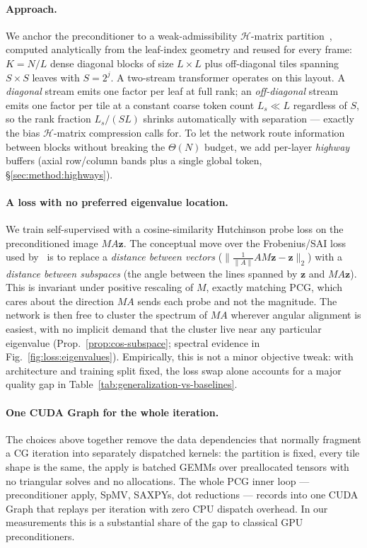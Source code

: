 \documentclass[acmtog,anonymous,review]{acmart}
\theoremstyle{plain}
\begin{document}
\paragraph{Approach.}\label{intro:hierarchical}\hypertarget{intro:hierarchical}{}%
We anchor the preconditioner to a weak-admissibility $\mathcal{H}$-matrix
partition~\cite{hackbusch2002adaptive}, computed analytically from the leaf-index
geometry and reused for every frame: $K\!=\!N/L$ dense diagonal blocks of size
$L\!\times\!L$ plus off-diagonal tiles spanning $S\!\times\!S$ leaves with $S\!=\!2^j$.
A two-stream transformer operates on this layout. A \emph{diagonal} stream emits one
factor per leaf at full rank; an \emph{off-diagonal} stream emits one factor per tile
at a constant coarse token count $L_s\!\ll\!L$ regardless of $S$, so the rank fraction
$L_s/(SL)$ shrinks automatically with separation --- exactly the bias $\mathcal{H}$-matrix
compression calls for. To let the network route information between blocks without
breaking the $\Theta(N)$ budget, we add per-layer \emph{highway} buffers (axial
row/column bands plus a single global token, \S\ref{sec:method:highways}).

\paragraph{A loss with no preferred eigenvalue location.}\label{intro:loss}\hypertarget{intro:loss}{}%
We train self-supervised with a cosine-similarity Hutchinson probe loss on the
preconditioned image $MA\mathbf{z}$. The conceptual move over the Frobenius/SAI loss
used by~\cite{Yang2025sparse} is to replace a \emph{distance between vectors}
($\|\tfrac{1}{\|A\|}AM\mathbf{z}-\mathbf{z}\|_2$) with a \emph{distance between
subspaces} (the angle between the lines spanned by $\mathbf{z}$ and $MA\mathbf{z}$).
This is invariant under positive rescaling of $M$, exactly matching PCG, which cares
about the direction $MA$ sends each probe and not the magnitude. The network is then
free to cluster the spectrum of $MA$ wherever angular alignment is easiest, with no
implicit demand that the cluster live near any particular eigenvalue
(Prop.~\ref{prop:cos-subspace}; spectral evidence in Fig.~\ref{fig:loss:eigenvalues}).
Empirically, this is not a minor objective tweak: with architecture and training split fixed,
the loss swap alone accounts for a major quality gap in Table~\ref{tab:generalization-vs-baselines}.

\paragraph{One CUDA Graph for the whole iteration.}\label{intro:cudagraph}\hypertarget{intro:cudagraph}{}%
The choices above together remove the data dependencies that normally fragment a CG
iteration into separately dispatched kernels: the partition is fixed, every tile shape
is the same, the apply is batched GEMMs over preallocated tensors with no triangular
solves and no allocations. The whole PCG inner loop --- preconditioner apply, SpMV,
SAXPYs, dot reductions --- records into one CUDA Graph that replays per iteration
with zero CPU dispatch overhead. In our measurements this is a substantial share of the
gap to classical GPU preconditioners.
\end{document}
